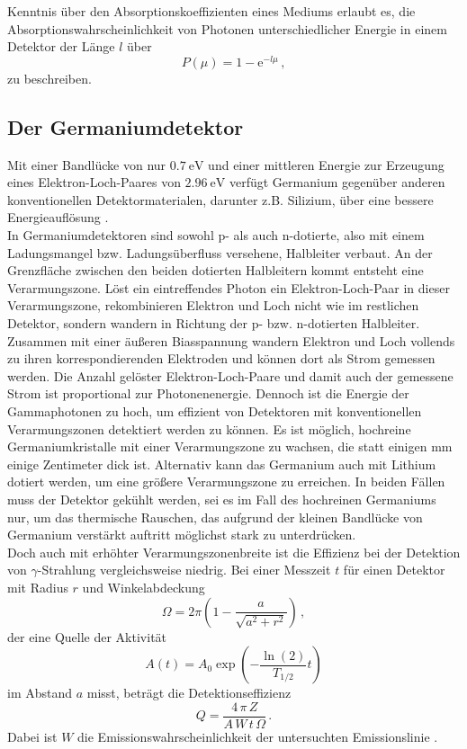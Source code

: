 Kenntnis über den Absorptionskoeffizienten eines Mediums erlaubt es, 
die Absorptionswahrscheinlichkeit von Photonen unterschiedlicher Energie in einem Detektor der Länge $l$ über
\begin{equation}
    P(\mu) = 1 - \text{e}^{-l \mu} \,,
    \label{eq:Absorptionswahrscheinlichkeit}
\end{equation}
zu beschreiben.

\subsection{Der Germaniumdetektor}

Mit einer Bandlücke von nur $\SI{0,7}{\eV}$ und einer mittleren Energie zur Erzeugung eines Elektron-Loch-Paares von $\SI{2,96}{\eV}$ verfügt Germanium gegenüber anderen
konventionellen Detektormaterialen, darunter z.B. Silizium, über eine bessere Energieauflösung \cite{Teilchendetektoren}. \\
In Germaniumdetektoren sind sowohl p- als auch n-dotierte, also mit einem Ladungsmangel bzw. Ladungsüberfluss versehene, 
Halbleiter verbaut.
An der Grenzfläche zwischen den beiden dotierten Halbleitern kommt entsteht eine Verarmungszone. 
Löst ein eintreffendes Photon ein Elektron-Loch-Paar in dieser Verarmungszone,
rekombinieren Elektron und Loch nicht wie im restlichen Detektor, sondern wandern in Richtung der p- bzw. n-dotierten Halbleiter.
Zusammen mit einer äußeren Biasspannung wandern Elektron und Loch vollends zu ihren korrespondierenden Elektroden und können dort als Strom gemessen werden.
Die Anzahl gelöster Elektron-Loch-Paare und damit auch der gemessene Strom ist proportional zur Photonenenergie.
Dennoch ist die Energie der Gammaphotonen zu hoch, um effizient von Detektoren mit konventionellen Verarmungszonen detektiert werden zu können.
Es ist möglich, hochreine Germaniumkristalle mit einer Verarmungszone zu wachsen, die statt einigen $\si{\milli\meter}$ einige Zentimeter dick ist.
Alternativ kann das Germanium auch mit Lithium dotiert werden, um eine größere Verarmungszone zu erreichen.
In beiden Fällen muss der Detektor gekühlt werden, sei es im Fall des hochreinen Germaniums nur, um das thermische Rauschen,
das aufgrund der kleinen Bandlücke von Germanium verstärkt auftritt möglichst stark zu unterdrücken. \\

Doch auch mit erhöhter Verarmungszonenbreite ist die Effizienz bei der Detektion von $\gamma$-Strahlung vergleichsweise niedrig.
Bei einer Messzeit $t$ für einen Detektor mit Radius $r$ und Winkelabdeckung
\begin{equation*}
    \Omega = 2 \pi \left(1 - \frac{a}{\sqrt{a^2 + r^2}}\right) \,,
\end{equation*}
der eine Quelle der Aktivität
\begin{equation*}
    A(t) = A_0 \exp \left(-\frac{\ln(2)}{T_{1/2}} t \right)
\end{equation*}
im Abstand $a$ misst, beträgt die Detektionseffizienz
\begin{equation}
    Q = \frac{4 \, \pi \, Z}{A \, W \, t \, \Omega} \,.
\end{equation}
Dabei ist $W$ die Emissionswahrscheinlichkeit der untersuchten Emissionslinie \cite{gamma}.

